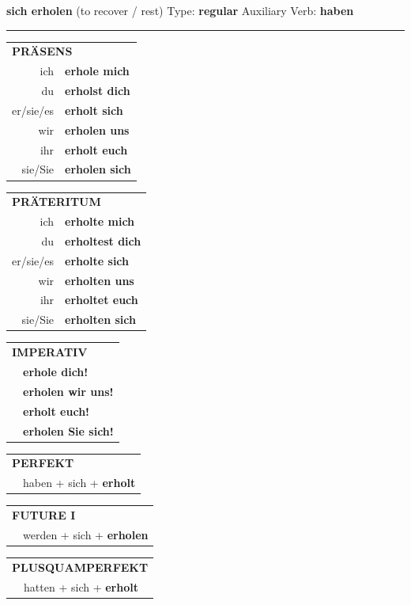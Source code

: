 \documentclass[10pt,a4paper]{revtex4-2}
\begin{document}
\begin{verbbox}
{\Large \bf sich erholen} (to recover / rest) \hfill Type: \textbf{regular} \hfill Auxiliary Verb: \textbf{haben}

\vspace{5pt}
\hrule
\vspace{5pt}

\begin{tabular}{rl}
\multicolumn{2}{l}{\textbf{PRÄSENS}}\\
ich & \textbf{erhole mich}\\
du & \textbf{erholst dich}\\
er/sie/es & \textbf{erholt sich}\\
wir & \textbf{erholen uns}\\
ihr & \textbf{erholt euch}\\
sie/Sie & \textbf{erholen sich}\\
\end{tabular}
\hfill
\begin{tabular}{rl}
\multicolumn{2}{l}{\textbf{PRÄTERITUM}}\\
ich & \textbf{erholte mich}\\
du & \textbf{erholtest dich}\\
er/sie/es & \textbf{erholte sich}\\
wir & \textbf{erholten uns}\\
ihr & \textbf{erholtet euch}\\
sie/Sie & \textbf{erholten sich}\\
\end{tabular}
\hfill
\begin{tabular}{rl}
\multicolumn{2}{l}{\textbf{IMPERATIV}}\\
& \textbf{erhole dich!}\\
& \textbf{erholen wir uns!}\\
& \textbf{erholt euch!}\\
& \textbf{erholen Sie sich!}\\
\end{tabular}

\vspace{10pt}

\begin{tabular}{rl}
\multicolumn{2}{l}{\textbf{PERFEKT}}\\
& haben + sich + \textbf{erholt}\\
\end{tabular}
\hfill
\begin{tabular}{rl}
\multicolumn{2}{l}{\textbf{FUTURE I}}\\
& werden + sich + \textbf{erholen}\\
\end{tabular}
\hfill
\begin{tabular}{rl}
\multicolumn{2}{l}{\textbf{PLUSQUAMPERFEKT}}\\
& hatten + sich + \textbf{erholt}\\
\end{tabular}


\end{verbbox}
\end{document}
